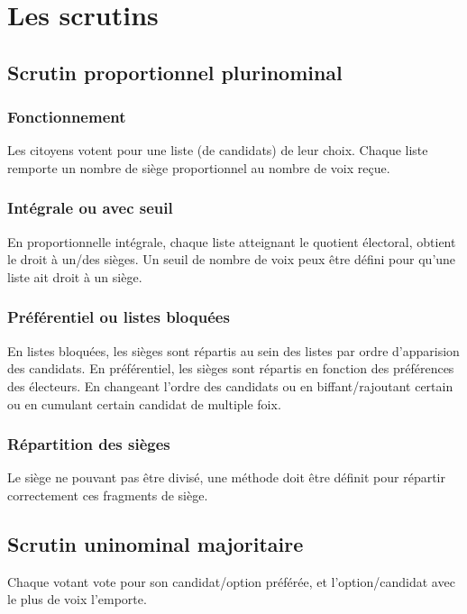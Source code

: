 \documentclass[../report]{subfiles}
\begin{document}
  \chapter{Les scrutins}

  \section{Scrutin proportionnel plurinominal}
  
  \subsection{Fonctionnement}
  
  Les citoyens votent pour une liste (de candidats) de leur choix.
  Chaque liste remporte un nombre de siège proportionnel au nombre de voix reçue.
  \cite{noauthor_scrutin_2021}
  
  \subsection{Intégrale ou avec seuil}
  En proportionnelle intégrale, chaque liste atteignant le quotient électoral, obtient
  le droit à un/des sièges.
  Un seuil de nombre de voix peux être défini pour qu'une liste ait droit à un siège.
  
  \subsection{Préférentiel ou listes bloquées}
  En listes bloquées, les sièges sont répartis au sein des listes par ordre d'apparision 
  des candidats.
  En préférentiel, les sièges sont répartis en fonction des préférences des électeurs.
  En changeant l'ordre des candidats ou en biffant/rajoutant certain ou en cumulant certain 
  candidat de multiple foix.
  
  \subsection{Répartition des sièges}
  Le siège ne pouvant pas être divisé, une méthode doit être définit pour répartir 
  correctement ces fragments de siège.
  
  \section{Scrutin uninominal majoritaire}
  
  Chaque votant vote pour son candidat/option préférée, et l'option/candidat avec le plus de
  voix l'emporte.
  
\end{document}
